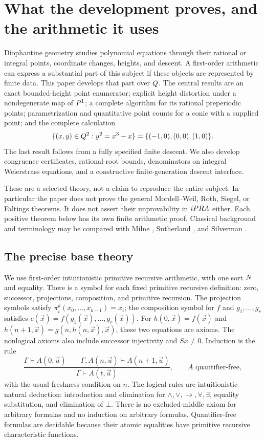 \section{What the development proves, and the arithmetic it uses}
\label{sec:foundations}

Diophantine geometry studies polynomial equations through their rational or
integral points, coordinate changes, heights, and descent. A first-order
arithmetic can express a substantial part of this subject if these objects are
represented by finite data. This paper develops that part over $Q$. The central
results are an exact bounded-height point enumerator; explicit height distortion
under a nondegenerate map of $P^1$; a complete algorithm for its rational
preperiodic points; parametrization and quantitative point counts for a conic
with a supplied point; and the complete calculation
\[
   \{(x,y)\in Q^2:y^2=x^3-x\}
       =\{(-1,0),(0,0),(1,0)\}.
\]
The last result follows from a fully specified finite descent. We also develop
congruence certificates, rational-root bounds, denominators on integral
Weierstrass equations, and a constructive finite-generation descent interface.

These are a selected theory, not a claim to reproduce the entire subject.
In particular the paper does not prove the general Mordell--Weil, Roth, Siegel,
or Faltings theorems. It does not assert their unprovability in $iPRA$ either.
Each positive theorem below has its own finite arithmetic proof. Classical
background and terminology may be compared with Milne \cite{milne}, Sutherland
\cite{sutherland2013,sutherland2025}, and Silverman \cite{silverman}.

\subsection{The precise base theory}

We use first-order intuitionistic primitive recursive arithmetic, with one
sort $N$ and equality. There is a symbol for each fixed primitive recursive
definition: zero, successor, projections, composition, and primitive recursion.
The projection symbols satisfy $\pi_i^k(x_0,\ldots,x_{k-1})=x_i$;
the composition symbol for $f$ and $g_1,\ldots,g_r$ satisfies
$c(\vec x)=f(g_1(\vec x),\ldots,g_r(\vec x))$.
For $h(0,\vec x)=f(\vec x)$ and
$h(n+1,\vec x)=g(n,h(n,\vec x),\vec x)$, these two equations are axioms.
The nonlogical axioms also include successor injectivity and $Sx\ne0$.
Induction is the rule
\[
 \frac{\Gamma\vdash A(0,\vec u)\qquad
       \Gamma,A(n,\vec u)\vdash A(n+1,\vec u)}
      {\Gamma\vdash A(t,\vec u)},
 \qquad A\text{ quantifier-free},
\]
with the usual freshness condition on $n$. The logical rules are intuitionistic
natural deduction: introduction and elimination for $\wedge,\vee,\to,\forall,
\exists$, equality substitution, and elimination of $\bot$. There is no
excluded-middle axiom for arbitrary formulas and no induction on arbitrary
formulas. Quantifier-free formulas are decidable because their atomic
equalities have primitive recursive characteristic functions.

